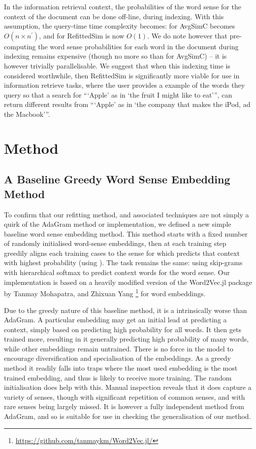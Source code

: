 \documentclass{sig-alternate}
\begin{document}
In the information retrieval context, the probabilities of the word sense for the context of the document can be done off-line, during indexing. With this assumption, the query-time time complexity becomes: for AvgSimC becomes $O(n\times n^{\prime})$, and for RefittedSim is now $O(1)$. 
We do note however that pre-computing the word sense probabilities for each word in the document during indexing remains expensive (though no more so than for AvgSimC) -- it is however trivially parallelisable. We suggest that when this indexing time is considered worthwhile, then RefittedSim is significantly more viable for use in information retrieve tasks, where the user provides a example of the words they query so that a search for \enquote{\enquote{Apple} as in \enquote{the fruit I might like to eat}}, can return different results from \enquote{\enquote{Apple} as in \enquote{the company that makes the iPod, ad the Macbook}}.


\section{Method} \label{method}


\subsection{A Baseline Greedy Word Sense Embedding Method}

To confirm that our refitting method, and associated techniques are not simply a quirk of the AdaGram method or implementation, we defined a new simple baseline word sense embedding method.
This method starts with a fixed number of randomly initialised word-sense embeddings, then at each training step greedily aligns each training cases to the sense for which predicts that context with highest probability (using ). The task remains the same: using skip-grams with hierarchical softmax to predict context words for the word sense.
Our implementation is based on a heavily modified version of the Word2Vec.jl package by Tanmay Mohapatra, and Zhixuan Yang \footnote{\url{https://github.com/tanmaykm/Word2Vec.jl/}} for word embeddings.

Due to the greedy nature of this baseline method, it is a intrinsically worse than AdaGram. A particular embedding may get an initial lead at predicting a context, simply based on predicting high probability for all words. It then gets trained more, resulting in it generally predicting high probability of many words, while other embeddings remain untrained. There is no force in the model to encourage diversification and specialisation of the embeddings. As a greedy method it readily falls into traps where the most used embedding is the most trained embedding, and thus is likely to receive more training. The random initialisation does help with this. Manual inspection reveals that it does capture a variety of senses, though with significant repetition of common senses, and with rare senses being largely missed. It is however a fully independent method from AdaGram, and so is suitable for use in checking the generalisation of our method.
\end{document}
